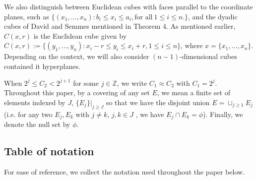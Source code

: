 \documentclass{article}
\newcounter{lem}
\theoremstyle{plain}
\theoremstyle{plain}
\newcommand{\Z}{\mathbb{Z}}
\theoremstyle{definition}
\theoremstyle{plain}
\begin{document}
We also distinguish between Euclidean cubes with faces parallel to the coordinate planes, such as $\{(x_1,\dots,x_n): b_i\leq x_i\leq a_i, \text{for all}\ 1\leq i\leq n.  \}$, and the dyadic cubes of David and Semmes\cite{DS1,DS2} mentioned in Theorem 4. As mentioned earlier, $C(x,r)$ is the Euclidean cube given by $C(x,r):=\{(y_1,\dots,y_n):x_i -r\leq y_i\leq x_i +r , 1\leq i\leq n\}$, where $x=\{x_1,\dots,x_n\}$. Depending on the context, we will also consider $(n-1)$-dimensional cubes contained it hyperplanes. 

When $2^{j}\leq C_2<2^{j+1}$ for some $j\in \Z$, we write $C_1\approx C_2$ with $C_1=2^j$. Throughout this paper, by a covering of any set $E$, we mean a finite set of elements indexed by $J$,  $\{E_j\}|_{j\geq J}$ so that we have the disjoint union $E=\sqcup_{j\geq 1}E_j$ (i.e. for any two $E_j, E_k$ with $j\neq k$, $j,k\in J$ , we have $E_j \cap E_k=\phi$). Finally, we denote the null set by $\phi$.

\subsection{Table of notation}
\label{sec:notation-table}
For ease of reference, we collect the notation used throughout the paper below.

%
\end{document}
